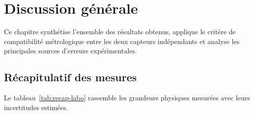 \chapter{Discussion générale}
\label{chap:analyse}

Ce chapitre synthétise l'ensemble des résultats obtenus, applique le critère de compatibilité métrologique entre les deux capteurs indépendants et analyse les principales sources d'erreurs expérimentales.

\section{Récapitulatif des mesures}
\label{sec:recap_resultats}

Le tableau~\ref{tab:recap-labo} rassemble les grandeurs physiques mesurées avec leurs incertitudes estimées.

